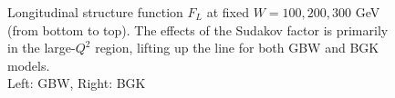 \documentclass[11pt]{article}
\begin{document}
\begin{figure}[H]
\caption{Longitudinal structure function $F_L$ at fixed $W=100, 200, 300$ GeV (from bottom to top).
The effects of the Sudakov factor is primarily in the large-$Q^2$ region, lifting up the line for both GBW and BGK models.\\ 
Left: GBW, Right: BGK}
\end{figure}
\end{document}
